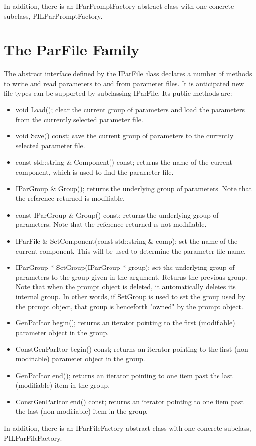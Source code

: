 In addition, there is an IParPromptFactory abstract
class with one concrete subclass, PILParPromptFactory.

\section{The ParFile Family}
The abstract interface defined by the IParFile class
declares a number of methods to write and read parameters
to and from parameter files. It is anticipated new file
types can be supported by subclassing IParFile. Its
public methods are:

\begin{itemize}
\item void Load(); clear the current group of parameters
and load the parameters from the currently selected parameter
file.
\item void Save() const; save the current group of parameters
to the currently selected parameter file.
\item const std::string \& Component() const; returns the name
of the current component, which is used to find the parameter
file.
\item IParGroup \& Group(); returns the underlying group of
parameters. Note that the reference returned is modifiable.
\item const IParGroup \& Group() const; returns the underlying
group of parameters. Note that the reference returned is
not modifiable.
\item IParFile \& SetComponent(const std::string \& comp); set
the name of the current component. This will be used to
determine the parameter file name.
\item IParGroup * SetGroup(IParGroup * group); set the
underlying group of parameters to the group given in
the argument. Returns the previous group. Note that when
the prompt object is deleted, it automatically deletes
its internal group. In other words, if SetGroup is used
to set the group used by the prompt object, that group is
henceforth "owned" by the prompt object.
\item GenParItor begin(); returns an iterator pointing to
the first (modifiable) parameter object in the group.
\item ConstGenParItor begin() const; returns an iterator
pointing to the first (non-modifiable) parameter object
in the group.
\item GenParItor end(); returns an iterator pointing to
one item past the last (modifiable) item in the group.
\item ConstGenParItor end() const; returns an iterator
pointing to one item past the last (non-modifiable) item
in the group.
\end{itemize}

In addition, there is an IParFileFactory abstract
class with one concrete subclass, PILParFileFactory.


